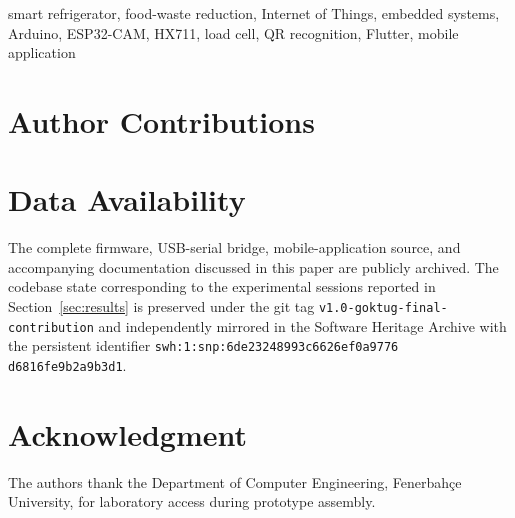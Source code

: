 \documentclass[conference]{IEEEtran}
\begin{document}


\begin{IEEEkeywords}
smart refrigerator, food-waste reduction, Internet of Things,
embedded systems, Arduino, ESP32-CAM, HX711, load cell, QR
recognition, Flutter, mobile application
\end{IEEEkeywords}










\section*{Author Contributions}


\section*{Data Availability}
The complete firmware, USB-serial bridge, mobile-application source,
and accompanying documentation discussed in this paper are publicly
archived. The codebase state corresponding to the experimental
sessions reported in Section~\ref{sec:results} is preserved under the
git tag \texttt{v1.0-goktug-final-contribution} and independently
mirrored in the Software Heritage Archive with the persistent
identifier \mbox{\texttt{swh:1:snp:6de23248993c6626ef0a9776}}
\mbox{\texttt{d6816fe9b2a9b3d1}}.

\section*{Acknowledgment}
The authors thank the Department of Computer Engineering, Fenerbahçe
University, for laboratory access during prototype assembly.



\end{document}
